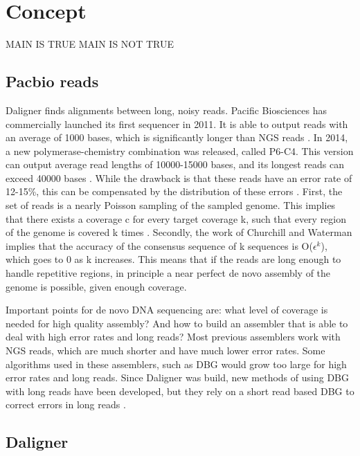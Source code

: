 \documentclass[../main/thesis.tex]{subfiles}
\begin{document}
\chapter{Concept}
\ifdefined\main
\acresetall
MAIN IS TRUE
\else
MAIN IS NOT TRUE

\fi

\section{Pacbio reads}
Daligner finds alignments between long, noisy reads.
Pacific Biosciences has commercially launched its first sequencer in 2011.
It is able to output reads with an average of 1000 bases, which is significantly longer than \ac{NGS} reads \cite{PBlaunch1}.
In 2014, a new polymerase-chemistry combination was released, called P6-C4.
This version can output average read lengths of 10000-15000 bases, and its longest reads can exceed 40000 bases \cite{Longreads}.
While the drawback is that these reads have an error rate of 12-15\%, this can be compensated by the distribution of these errors \cite{Daligner}.
First, the set of reads is a nearly Poisson sampling of the sampled genome.
This implies that there exists a coverage c for every target coverage k, such that every region of the genome is covered k times \cite{Poisson}.
Secondly, the work of Churchill and Waterman \cite{quality} implies that the accuracy of the consensus sequence of k sequences is O($\epsilon^k$), which goes to 0 as k increases.
This means that if the reads are long enough to handle repetitive regions, in principle a near perfect de novo assembly of the genome is possible, given enough coverage.

Important points for de novo DNA sequencing are: what level of coverage is needed for high quality assembly?
And how to build an assembler that is able to deal with high error rates and long reads?
Most previous assemblers work with \ac{NGS} reads, which are much shorter and have much lower error rates.
Some algorithms used in these assemblers, such as \ac{DBG} \cite{DeBruijn} would grow too large for high error rates and long reads.
Since Daligner was build, new methods of using \ac{DBG} with long reads have been developed, but they rely on a short read based \ac{DBG} to correct errors in long reads \cite{DBG1}\cite{DBG2}.

\section{Daligner}
\end{document}
